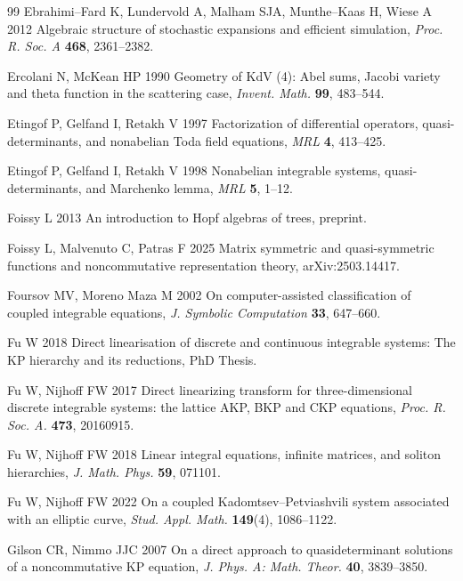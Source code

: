 \documentclass[5p,twocolumn]{elsarticle}
\begin{document}
\begin{thebibliography}{99}
 Ebrahimi--Fard K, Lundervold A, Malham SJA, Munthe--Kaas H, Wiese A 2012 Algebraic structure of stochastic expansions and efficient simulation, \textit{Proc. R. Soc. A} \textbf{468}, 2361--2382. 
  
 Ercolani N, McKean HP 1990 Geometry of KdV (4): Abel sums, Jacobi variety and theta function in the scattering case, \textit{Invent. Math.\/} \textbf{99}, 483--544.  

 Etingof P, Gelfand I, Retakh V 1997 Factorization of differential operators, quasi-determinants, and nonabelian Toda field equations, \textit{MRL} \textbf{4}, 413--425.  
  
 Etingof P, Gelfand I, Retakh V 1998 Nonabelian integrable systems, quasi-determinants, and Marchenko lemma, \textit{MRL} \textbf{5}, 1--12.  

 Foissy L 2013 An introduction to Hopf algebras of trees, preprint.

 Foissy L, Malvenuto C, Patras F 2025 Matrix symmetric and quasi-symmetric functions and noncommutative representation theory, arXiv:2503.14417. 

 Foursov MV, Moreno Maza M 2002 On computer-assisted classification of coupled integrable equations, \textit{J. Symbolic Computation} \textbf{33}, 647--660.
  
 Fu W 2018 Direct linearisation of discrete and continuous integrable systems: The KP hierarchy and its reductions, PhD Thesis.

 Fu W, Nijhoff FW 2017 Direct linearizing transform for three-dimensional discrete integrable systems: the lattice AKP, BKP and CKP equations,
  \textit{Proc. R. Soc. A.\/} \textbf{473}, 20160915.

 Fu W, Nijhoff FW 2018 Linear integral equations, infinite matrices, and soliton hierarchies, \textit{J. Math. Phys.\/} \textbf{59}, 071101.
  
 Fu W, Nijhoff FW 2022 On a coupled Kadomtsev--Petviashvili system associated with an elliptic curve, \textit{Stud. Appl. Math.\/} \textbf{149}(4), 1086--1122.  

 Gilson CR, Nimmo JJC 2007 On a direct approach to quasideterminant solutions of a noncommutative KP equation, \textit{J. Phys. A: Math. Theor.\/} \textbf{40}, 3839--3850.

  

\end{thebibliography}
\end{document}
